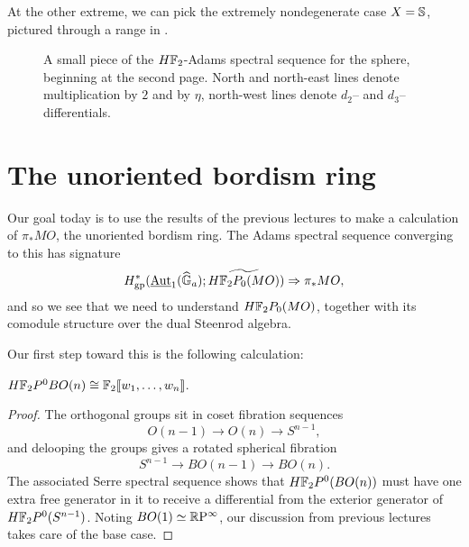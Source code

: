 \begin{example}
At the other extreme, we can pick the extremely nondegenerate case $X = \S$, pictured through a range in .
\begin{landscape}
\begin{figure}[b]


\caption{A small piece of the $H\F_2$-Adams spectral sequence for the sphere, beginning at the second page.  North and north-east lines denote multiplication by $2$ and by $\eta$, north-west lines denote $d_2$-- and $d_3$--differentials.}\label{HF2ASSFigure}
\end{figure}
\end{landscape}
\end{example}










\section{The unoriented bordism ring}

Our goal today is to use the results of the previous lectures to make a calculation of $\pi_* MO$, the unoriented bordism ring.  The Adams spectral sequence converging to this has signature \[H^*_{\mathrm{gp}}(\InternalAut_1(\G_a); \widetilde{H\F_2P_0(MO)}) \Rightarrow \pi_* MO,\]  and so we see that we need to understand $H\F_2P_0(MO)$, together with its comodule structure over the dual Steenrod algebra.

Our first step toward this is the following calculation:
\begin{lemma}
$H\F_2P^0 BO(n) \cong \F_2 \llbracket w_1, \ldots, w_n \rrbracket$.
\end{lemma}
\begin{proof}
The orthogonal groups sit in coset fibration sequences \[O(n-1) \to O(n) \to S^{n-1},\] and delooping the groups gives a rotated spherical fibration \[S^{n-1} \to BO(n-1) \to BO(n).\]  The associated Serre spectral sequence shows that $H\F_2P^0(BO(n))$ must have one extra free generator in it to receive a differential from the exterior generator of $H\F_2P^0(S^{n-1})$.  Noting $BO(1) \simeq \RP^\infty$, our discussion from previous lectures takes care of the base case.
\end{proof}

